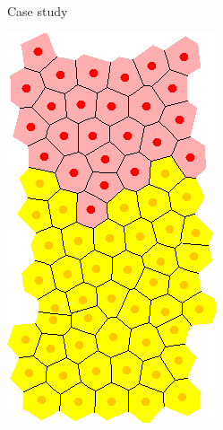 \documentclass[t,xcolor={usenames,dvipsnames}]{beamer}
\begin{document}
\begin{frame}{Case study}
\centering
\begin{minipage}{0.28\textwidth}
\includegraphics[width=.9\textwidth]{VariableWnt}
\end{minipage}
\begin{minipage}{0.39\textwidth}

\end{minipage}
\end{frame}
\end{document}
